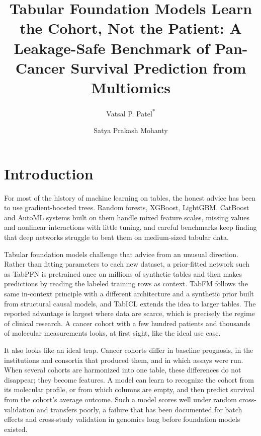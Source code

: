 \documentclass[11pt, a4paper, onecolumn, confidential, copyright]{hawkfranklin}
\title{Tabular Foundation Models Learn the Cohort, Not the Patient: A Leakage-Safe Benchmark of Pan-Cancer Survival Prediction from Multiomics}
\author[1]{Vatsal P. Patel\textsuperscript{*}}
\author[1]{Satya Prakash Mohanty}
\affil[1]{HawkFranklin Research, India}
\affil[ ]{\textsuperscript{*}Corresponding author: \href{mailto:vatsal1@hawkfranklin.in}{vatsal1@hawkfranklin.in}}
\begin{document}
\maketitle

\section{Introduction}
\label{sec:introduction}

For most of the history of machine learning on tables, the honest advice has been to use gradient-boosted trees. Random forests, XGBoost, LightGBM, CatBoost and AutoML systems built on them handle mixed feature scales, missing values and nonlinear interactions with little tuning, and careful benchmarks keep finding that deep networks struggle to beat them on medium-sized tabular data.\citep{breiman2001random,chen2016xgboost,ke2017lightgbm,prokhorenkova2018catboost,erickson2020autogluon,grinsztajn2022tree}

Tabular foundation models challenge that advice from an unusual direction. Rather than fitting parameters to each new dataset, a prior-fitted network such as TabPFN is pretrained once on millions of synthetic tables and then makes predictions by reading the labeled training rows as context.\citep{hollmann2025accurate} TabFM follows the same in-context principle with a different architecture and a synthetic prior built from structural causal models,\citep{google2026tabfm,tabfmsoftware2026} and TabICL extends the idea to larger tables.\citep{qu2025tabicl} The reported advantage is largest where data are scarce, which is precisely the regime of clinical research. A cancer cohort with a few hundred patients and thousands of molecular measurements looks, at first sight, like the ideal use case.

It also looks like an ideal trap. Cancer cohorts differ in baseline prognosis, in the institutions and consortia that produced them, and in which assays were run. When several cohorts are harmonized into one table, these differences do not disappear; they become features. A model can learn to recognize the cohort from its molecular profile, or from which columns are empty, and then predict survival from the cohort's average outcome. Such a model scores well under random cross-validation and transfers poorly, a failure that has been documented for batch effects and cross-study validation in genomics long before foundation models existed.\citep{soneson2014batch,bernau2014crossstudy,ambroise2002selection}
\end{document}
